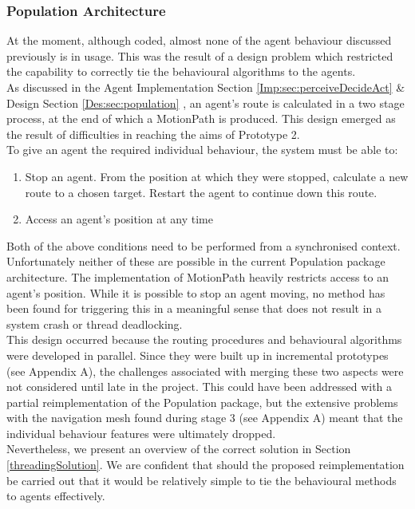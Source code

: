 \subsubsection{Population Architecture}
At the moment, although coded, almost none of the agent behaviour discussed previously is in usage. This was the result of a design problem which restricted the capability to correctly tie the behavioural algorithms to the agents.\\
As discussed in the Agent Implementation Section \ref{Imp:sec:perceiveDecideAct} \& Design Section \ref{Des:sec:population} , an agent's route is calculated in a two stage process, at the end of which a MotionPath is produced. This design emerged as the result of difficulties in reaching the aims of Prototype 2.\\
To give an agent the required individual behaviour, the system must be able to:
\begin{enumerate}
\item{Stop an agent. From the position at which they were stopped, calculate a new route to a chosen target. Restart the agent to continue down this route.}
\item{Access an agent's position at any time}
\end{enumerate}
Both of the above conditions need to be performed from a synchronised context. Unfortunately neither of these are possible in the current Population package architecture. The implementation of MotionPath heavily restricts access to an agent's position. While it is possible to stop an agent moving, no method has been found for triggering this in a meaningful sense that does not result in a system crash or thread deadlocking.\\
This design occurred because the routing procedures and behavioural algorithms were developed in parallel. Since they were built up in incremental prototypes (see Appendix A), the challenges associated with merging these two aspects were not considered until late in the project. This could have been addressed with a partial reimplementation of the Population package, but the extensive problems with the navigation mesh found during stage 3 (see Appendix A) meant that the individual behaviour features were ultimately dropped.\\
Nevertheless, we present an overview of the correct solution in Section \ref{threadingSolution}. We are confident that should the proposed reimplementation be carried out that it would be relatively simple to tie the behavioural methods to agents effectively.
